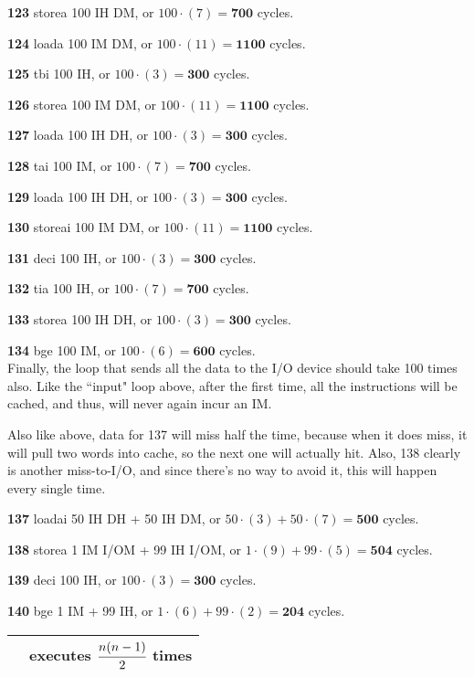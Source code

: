 \documentclass[a4paper]{article}
\begin{document}
\textbf{123} storea 100 IH DM, or $100 \cdot (7) = \mathbf{700}$ cycles.

\textbf{124} loada 100 IM DM, or $100 \cdot (11) = \mathbf{1100}$ cycles.

\textbf{125} tbi 100 IH, or $100 \cdot (3) = \mathbf{300}$ cycles.

\textbf{126} storea 100 IM DM, or $100 \cdot (11) = \mathbf{1100}$ cycles.

\textbf{127} loada 100 IH DH, or $100 \cdot (3) = \mathbf{300}$ cycles.

\textbf{128} tai 100 IM, or $100 \cdot (7) = \mathbf{700}$ cycles.

\textbf{129} loada 100 IH DH, or $100 \cdot (3) = \mathbf{300}$ cycles.

\textbf{130} storeai 100 IM DM, or $100 \cdot (11) = \mathbf{1100}$ cycles.

\textbf{131} deci 100 IH, or $100 \cdot (3) = \mathbf{300}$ cycles.

\textbf{132} tia 100 IH, or $100 \cdot (7) = \mathbf{700}$ cycles.

\textbf{133} storea 100 IH DH, or $100 \cdot (3) = \mathbf{300}$ cycles.

\textbf{134} bge 100 IM, or $100 \cdot (6) = \mathbf{600}$ cycles. \\

Finally, the loop that sends all the data to the I/O device should take 100 times also. Like the ``input" loop above, after the first time, all the instructions will be cached, and thus, will never again incur an IM.

Also like above, data for 137 will miss half the time, because when it does miss, it will pull two words into cache, so the next one will actually hit. Also, 138 clearly is another miss-to-I/O, and since there's no way to avoid it, this will happen every single time.

\textbf{137} loadai 50 IH DH + 50 IH DM, or $50 \cdot (3) + 50 \cdot (7) = \mathbf{500}$ cycles.

\textbf{138} storea 1 IM I/OM + 99 IH I/OM, or $1 \cdot (9) + 99 \cdot (5) = \mathbf{504}$ cycles.

\textbf{139} deci 100 IH, or $100 \cdot (3) = \mathbf{300}$ cycles.

\textbf{140} bge 1 IM + 99 IH, or $1 \cdot (6) + 99 \cdot (2) = \mathbf{204}$ cycles. \\

\begin{tabular}{|c|c|}
\hline
\cellcolor{yellow} & executes $\cfrac{n(n-1)}{2}$ times \\
\hline
\end{tabular}
\end{document}

